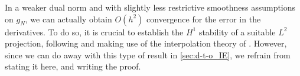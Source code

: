 \documentclass[english,a4paper,9pt,oneside]{scrbook}	%
\theoremstyle{break}
\newtheorem{cor}[equation]{Corollary}
\newenvironment{mproof}[1][\proofname]{%
  \begin{proof}[#1]$ $\par\nobreak\ignorespaces
}{%
  \end{proof}
}
\renewcommand*{\proofname}{Proof}
\theoremstyle{remark}
\newcommand{\norm}[1]{\left\lVert#1\right\rVert}
\newcommand{\ind}[1]{\{\text{ #1 }\}}
\begin{document}
\begin{appendices}
In a weaker dual norm and with slightly less restrictive smoothness assumptions on $g_N$, we can actually obtain $O(h^2)$ convergence for the error in the derivatives. To do so, it is crucial to establish the $H^1$ stability of a suitable $L^2$ projection, following \cite{bank} and making use of the interpolation theory of \cite{bernardi}. However, since we can do away with this type of result in \cref{sec:d-t-o_IE}, we refrain from stating it here, and writing the proof.


%
%
%
%
%
%
%
%
%
%

\end{appendices}
\end{document}
